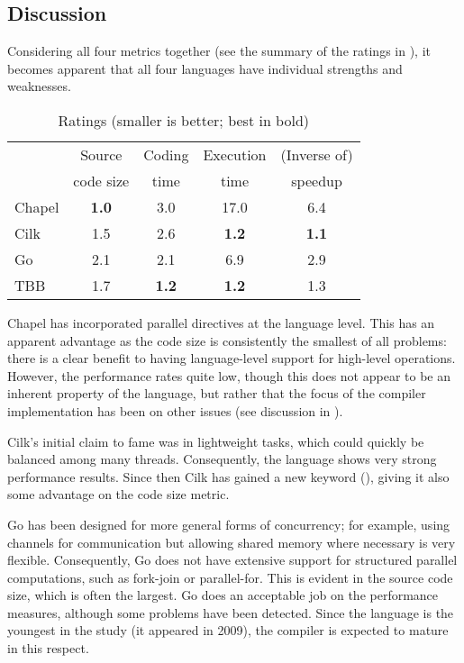 \subsection{Discussion}
\label{sec:discussion}

Considering all four metrics together (see the summary of the ratings in ), it becomes apparent that all four languages have individual strengths and weaknesses.

\begin{table}[htb]
  \centering
\def\arraystretch{1.1}
{\footnotesize
  \begin{tabular}{l|cccc}
         & Source       & Coding       & Execution    & (Inverse of) \\
         & code size    & time         & time         & speedup\\
\hline
Chapel   & \textbf{1.0} & 3.0          & 17.0         & 6.4 \\
Cilk     & 1.5          & 2.6          & \textbf{1.2} & \textbf{1.1} \\
Go       & 2.1          & 2.1          & 6.9          & 2.9 \\
TBB      & 1.7          & \textbf{1.2} & \textbf{1.2} & 1.3 \\
  \end{tabular}
}
  \vspace{2ex}
  \caption{Ratings (smaller is better; best in bold)}
  \label{tab:overallranks}
  \vspace{-2ex}
\end{table}

Chapel has incorporated parallel directives at the language level. This has an apparent advantage as the code size is consistently the smallest of all problems: there is a clear benefit to having language-level support for high-level operations.  However, the performance rates quite low, though this does not appear to be an inherent property of the language, but rather that the focus of the compiler implementation has been on other issues (see discussion in ).

Cilk's initial claim to fame was in lightweight tasks, which could quickly be balanced among many threads. Consequently, the language shows very strong performance results. Since then Cilk has gained a new keyword (), giving it also some advantage on the code size metric.

Go has been designed for more general forms of concurrency; for example, using channels for communication but allowing shared memory where necessary is very flexible. Consequently, Go does not have extensive support for structured parallel computations, such as fork-join or parallel-for. This is evident in the source code size, which is often the largest. Go does an acceptable job on the performance measures, although some problems have been detected. Since the language is the youngest in the study (it appeared in 2009), the compiler is expected to mature in this respect.

